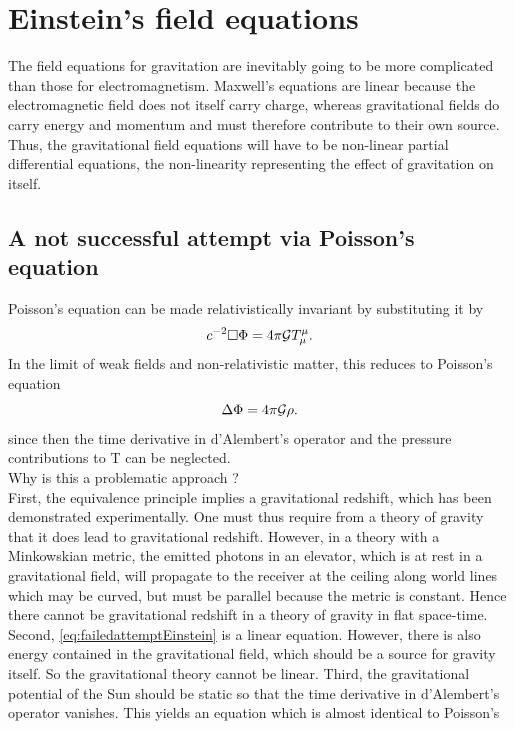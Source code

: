 \newpage
\section{Einstein's field equations}
The field equations for gravitation are inevitably going to be more complicated than those for electromagnetism. Maxwell's equations are linear because the electromagnetic field does not itself carry charge, whereas gravitational fields do carry energy and momentum and must therefore contribute to their own source. Thus, the gravitational field equations will have to be non-linear partial differential equations, the non-linearity representing the effect of gravitation on itself.
\subsection{A not successful attempt via Poisson's equation}
Poisson’s equation can be made relativistically invariant by substituting it by
\begin{equation}
\label{eq:failedattemptEinstein}
	c^{-2} \square  \Phi = 4 \pi \mathcal{G} T^\mu_\mu.
\end{equation}
In the limit of weak fields and
non-relativistic matter, this reduces to Poisson’s equation
\begin{equation}
	\Delta \Phi = 4 \pi \mathcal{G} \rho.
\end{equation}
since then the time derivative in d’Alembert’s operator and the pressure contributions to T can
be neglected.\\
Why is this a problematic approach ?\\
First, the equivalence principle implies a gravitational redshift, which has been demonstrated
experimentally. One must thus require from a theory of gravity that it does lead to gravitational
redshift. However, in a theory with a Minkowskian metric, the emitted photons in an elevator,
which is at rest in a gravitational field, will propagate to the receiver at the ceiling along world
lines which may be curved, but must be parallel because the metric is constant. Hence there
cannot be gravitational redshift in a theory of gravity in flat space-time.
Second, \ref{eq:failedattemptEinstein} is a linear equation. However, there is also energy contained in the gravitational
field, which should be a source for gravity itself. So the gravitational theory cannot be linear.
Third, the gravitational potential of the Sun should be static so that the time derivative in
d’Alembert’s operator vanishes. This yields an equation which is almost identical to Poisson’s
